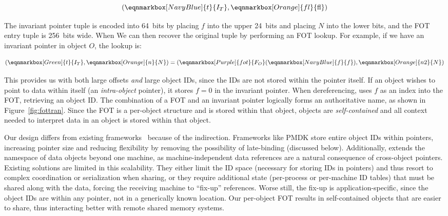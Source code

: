 \begin{equation*}
    \left(
    \eqnmarkbox[NavyBlue]{t}{I_T},
    \eqnmarkbox[Orange]{fl}{\mathrm{fl}}
    \right)
\end{equation*}

The invariant pointer tuple is encoded into 64~bits by placing $f$ into the upper 24~bits and placing $N$ into the lower
bits, and the FOT entry tuple is 256~bits wide. When
We can then recover the original tuple by performing an FOT lookup. For example, if we have an invariant pointer in
object $O$, the lookup is:

\begin{equation}\label{eq:fot}
    \left(
    \eqnmarkbox[Green]{t}{I_T}
    , \eqnmarkbox[Orange]{n}{N}\right) = \left(
    \eqnmarkbox[Purple]{fot}{F_O}(\eqnmarkbox[NavyBlue]{f}{f})
    , \eqnmarkbox[Orange]{n2}{N}
    \right)
\end{equation}
\vspace{0.4em}

This provides us
with both large offsets \emph{and} large object IDs, since the IDs are not stored within the pointer
itself.
If an object wishes to point to data within itself (an \emph{intra-object} pointer), it stores $f = 0$ in
the invariant pointer. When dereferencing, \Twizzler uses $f$
as an index into the FOT, retrieving an object ID\@.
The combination of a FOT and an invariant pointer logically forms
an authoritative name, as shown in Figure~\ref{fig:fottran}. Since the FOT is a per-object structure and is stored
within that object, objects are \emph{self-contained} and all context needed to interpret data in an object is stored
within that object.

Our design differs from existing
frameworks~\cite{corbato_introduction_1965,bensoussan:sosp69,daley:cacm68,pmdk-pointers,libpmem,Chen:micro17}
because of the indirection. Frameworks like PMDK store entire object IDs within pointers,
increasing pointer size and reducing flexibility by removing
the possibility of late-binding (discussed below). Additionally, \Twizzler extends the
namespace of data objects beyond one machine, as machine-independent data references
are a natural consequence of cross-object pointers. Existing solutions are limited
in this scalability. They either limit the ID space (necessary for storing IDs
in pointers) and thus resort to complex coordination or serialization when sharing, or
they require additional state (\eg per-process or per-machine ID tables) that must
be shared along with the data, forcing the receiving machine to ``fix-up''
references. Worse still, the fix-up is application-specific, since the object IDs are
within any pointer, not in a generically known location.
Our per-object FOT results in self-contained objects that are easier to share, thus interacting better with remote shared memory systems.

